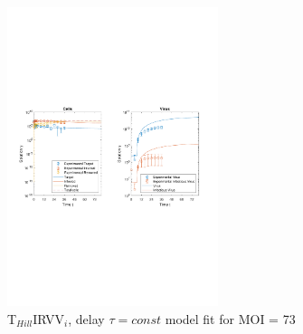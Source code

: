\begin{figure}[H]
\begin{center}
\includegraphics[width=0.55\textwidth, trim={1cm 9.5cm 1cm 9.5cm}, clip]{D_chapters/6_appendix/4_THillIRVViDelayFitTau/ModelTHillIRVViDelayFitTauDSNFittedMOI73B0.000659D0.55529P5629.8721C0.066804TIC2576955.7218TH4.025T0.2iFrac0.025402log.pdf}
\caption[T$_{Hill}$IRVV$_i$, delay $\tau = const$ model fit for MOI = 73]%
{T$_{Hill}$IRVV$_i$, delay $\tau = const$ model fit for MOI = 73}
\label{figure:THillIRVViDelayFitTauMOI73}
\end{center}
\end{figure}